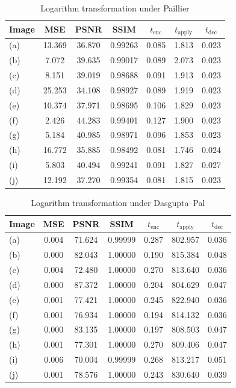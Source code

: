 \begin{table}[h]
	\centering
	\caption{Logarithm transformation under Paillier}
	\label{tbl:log-pal}
    \begin{tabular}{lcccccc}
        \toprule
        Image & MSE  & PSNR & SSIM & $t_\text{enc}$ & $t_\text{apply}$ & $t_\text{dec}$ \\ \midrule
		(a) & 13.369 & 36.870 & 0.99263 & 0.085 & 1.813 & 0.023 \\
		(b) & 7.072 & 39.635 & 0.99017 & 0.089 & 2.073 & 0.023 \\
		(c) & 8.151 & 39.019 & 0.98688 & 0.091 & 1.913 & 0.023 \\
		(d) & 25.253 & 34.108 & 0.98927 & 0.089 & 1.919 & 0.023 \\
		(e) & 10.374 & 37.971 & 0.98695 & 0.106 & 1.829 & 0.023 \\
		(f) & 2.426 & 44.283 & 0.99401 & 0.127 & 1.900 & 0.023 \\
		(g) & 5.184 & 40.985 & 0.98971 & 0.096 & 1.853 & 0.023 \\
		(h) & 16.772 & 35.885 & 0.98492 & 0.081 & 1.746 & 0.024 \\
		(i) & 5.803 & 40.494 & 0.99241 & 0.091 & 1.827 & 0.027 \\
		(j) & 12.192 & 37.270 & 0.99354 & 0.081 & 1.815 & 0.023 \\
		\bottomrule
        \end{tabular}
\end{table}
\begin{table}[h]
	\caption{Logarithm transformation under Dasgupta--Pal}
	\label{tbl:log-dp}
    \begin{tabular}{lcccccc}
        \toprule
        Image & MSE  & PSNR & SSIM & $t_\text{enc}$ & $t_\text{apply}$ & $t_\text{dec}$ \\ \midrule
		(a) & 0.004 & 71.624 & 0.99999 & 0.287 & 802.957 & 0.036 \\
		(b) & 0.000 & 82.043 & 1.00000 & 0.190 & 815.384 & 0.048 \\
		(c) & 0.004 & 72.480 & 1.00000 & 0.270 & 813.640 & 0.036 \\
		(d) & 0.000 & 87.372 & 1.00000 & 0.204 & 804.629 & 0.047 \\
		(e) & 0.001 & 77.421 & 1.00000 & 0.245 & 822.940 & 0.036 \\
		(f) & 0.001 & 76.934 & 1.00000 & 0.194 & 814.132 & 0.036 \\
		(g) & 0.000 & 83.135 & 1.00000 & 0.197 & 808.503 & 0.047 \\
		(h) & 0.001 & 77.301 & 1.00000 & 0.270 & 809.406 & 0.047 \\
		(i) & 0.006 & 70.004 & 0.99999 & 0.268 & 813.217 & 0.051 \\
		(j) & 0.001 & 78.576 & 1.00000 & 0.243 & 830.640 & 0.039 \\
		\bottomrule
        \end{tabular}
\end{table}

